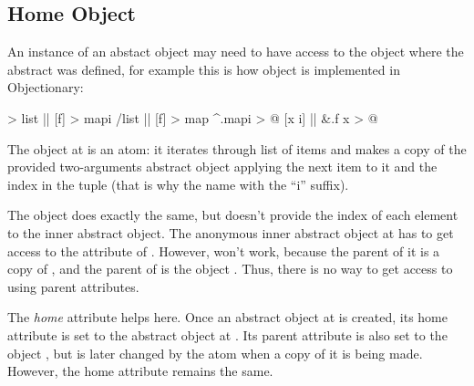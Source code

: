 \subsection{Home Object}

An instance of an abstact object may need to have access to the
object where the abstract was defined, for example this is
how object  is implemented in Objectionary:

\begin{ffcode}
[] > list |$\label{ln:list-parent}$|
  [f] > mapi /list |$\label{ln:list-map}$|
  [f] > map
    ^.mapi > @
      [x i] |$\label{ln:map-inner}$|
        &.f x > @
\end{ffcode}

The object  at  is an atom:
it iterates through list of items and makes
a copy of the provided two-arguments abstract object  applying the next
item to it and the index in the tuple (that is why the name with the ``i'' suffix).

The object  does exactly the same, but doesn't provide the
index of each element to the inner abstract object.
The anonymous inner abstract object at 
has to get access to the attribute  of .
However,  won't work, because the parent of it is a copy of , and the
parent of  is the object .
Thus, there is no way to get access
to  using parent attributes.

The \emph{home} attribute \ff{\&} helps here.
Once an abstract object at  is created, its
home attribute is set to the abstract object  at .
Its parent attribute \ff{\^{}} is also set to the object ,
but is later changed by the atom  when a copy of it is being made.
However, the home attribute remains the same.
